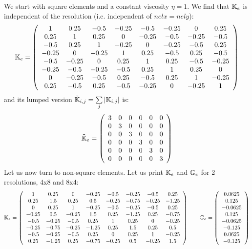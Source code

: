 We start with square elements and a constant viscosity $\eta=1$. We find that ${\mathbb{K}}_e$ is independent of the resolution (i.e. independent of $nelx=nely$):
\[
{\mathbb{K}}_e=
\left(
\begin{array}{cccccccc}
1    & 0.25 & -0.5 & -0.25 & -0.5  & -0.25 & 0     & 0.25 \\
0.25 & 1    & 0.25 & 0     & -0.25 & -0.5  & -0.25 & -0.5 \\
-0.5 & 0.25 & 1    & -0.25 &     0 & -0.25 & - 0.5 & 0.25 \\
-0.25 & 0 & -0.25 & 1 & 0.25 & -0.5 & 0.25 & -0.5 \\
-0.5 & -0.25 & 0 & 0.25 & 1 & 0.25 & -0.5 & -0.25 \\
-0.25 & -0.5 & -0.25 & -0.5 & 0.25 & 1 & 0.25 & 0 \\
0 & -0.25 & -0.5 & 0.25 & -0.5 & 0.25 & 1 & -0.25 \\
0.25 & -0.5 & 0.25 & -0.5 & -0.25 & 0 & -0.25 & 1 
\end{array}
\right)
\]
and its lumped version $\tilde{{\mathbb{K}}}_{i,j}=\sum\limits_j | {\mathbb{K}}_{i,j}|$ is:
\[
\tilde{{\mathbb{K}}}_e=
\left(
\begin{array}{cccccccc}
3 & 0 & 0 & 0 & 0 & 0 \\
0 & 3 & 0 & 0 & 0 & 0 \\
0 & 0 & 3 & 0 & 0 & 0 \\
0 & 0 & 0 & 3 & 0 & 0 \\
0 & 0 & 0 & 0 & 3 & 0 \\
0 & 0 & 0 & 0 & 0 & 3 
\end{array}
\right)
\]
Let us now turn to non-square elements. Let us print ${\mathbb{K}}_e$ and ${\mathbb{G}}_e$ for 2 resolutions, 4x8 and 8x4:
\[
{\mathbb{K}}_e=
\left(
\begin{array}{cccccccc}
 1&  0.25&  0& -0.25& -0.5& -0.25& -0.5&  0.25\\
 0.25&  1.5&  0.25&  0.5& -0.25& -0.75& -0.25& -1.25\\
 0&  0.25&  1& -0.25& -0.5& -0.25& -0.5&  0.25\\
-0.25&  0.5& -0.25&  1.5&  0.25& -1.25&  0.25& -0.75\\
-0.5& -0.25& -0.5&  0.25&  1&  0.25& 0& -0.25\\
-0.25& -0.75& -0.25& -1.25&  0.25&  1.5&  0.25&  0.5\\
-0.5& -0.25& -0.5&  0.25& 0&  0.25&  1& -0.25\\
 0.25& -1.25&  0.25& -0.75& -0.25&  0.5& -0.25&  1.5
\end{array}
\right)
\qquad
{\mathbb{G}}_e = 
\left(
\begin{array}{c}
 0.0625\\
 0.125\\
-0.0625\\
 0.125\\
-0.0625\\
-0.125\\
 0.0625\\
-0.125
\end{array}
\right)
\]
 

